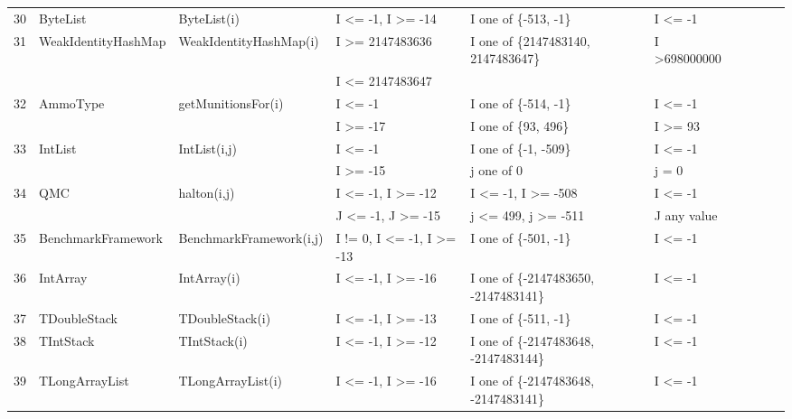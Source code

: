 \documentclass[runningheads,a4paper]{llncs}
\begin{document}
\begin{table}[h]
{\begin{tabular}{llllllllll}
30	& ByteList					& ByteList(i)					& I \textless= -1, I \textgreater= -14			& I one of \{-513, -1\}	 				& I \textless= -1						\\ 
31	& WeakIdentityHashMap		& WeakIdentityHashMap(i)		& I \textgreater= 2147483636				& I one of \{2147483140, 2147483647\}	& I \textgreater 698000000			\\ 
	&                                             &                                             & I \textless= 2147483647					& 										&  			   						\\
32	& AmmoType				& getMunitionsFor(i)			& I \textless= -1								& I one of \{-514, -1\}					& I \textless= -1 					\\ 			
	&                                             &                                             & I \textgreater= -17							& I one of \{93, 496\}						& I \textgreater= 93		   			\\
33	& IntList						& IntList(i,j)					& I \textless= -1								& I one of \{-1, -509\}					& I \textless= -1						\\ 		
	&                                             &                                             & I \textgreater= -15							& j one of {0}								& j = 0		   						\\
34	& QMC						& halton(i,j)					& I \textless= -1, I \textgreater= -12			& I \textless= -1, I \textgreater= -508		& I \textless= -1						\\ 
	&                                             &                                             & J \textless= -1, J \textgreater= -15			& j \textless= 499, j \textgreater= -511	& J any value			 		  		\\	
35	& BenchmarkFramework		& BenchmarkFramework(i,j)	& I != 0, I \textless= -1, I \textgreater= -13	& I one of \{-501, -1\}					& I \textless= -1						\\ 
36	& IntArray					& IntArray(i)					& I \textless= -1, I \textgreater= -16			& I one of \{-2147483650, -2147483141\}	& I \textless= -1						\\ 
37	& TDoubleStack				& TDoubleStack(i)			& I \textless= -1, I \textgreater= -13			& I one of \{-511, -1\}					& I \textless= -1						\\ 
38	& TIntStack					& TIntStack(i)				& I \textless= -1, I \textgreater= -12			& I one of \{-2147483648, -2147483144\}	& I \textless= -1						\\ 
39	& TLongArrayList				& TLongArrayList(i)			& I \textless= -1, I \textgreater= -16			& I one of \{-2147483648, -2147483141\}	& I \textless= -1						\\ 

\end{tabular}}
\end{table}
\end{document}
